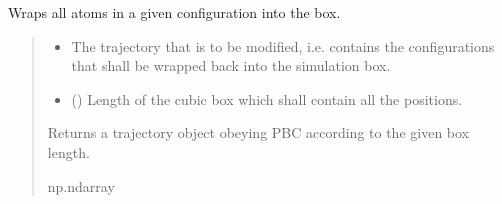 \documentclass[a4paper,10pt,english]{report}
\begin{document}
\begin{fulllineitems}
\label{\detokenize{NNucleate:NNucleate.utils.pbc_config}}
\pysigstartsignatures
{}
\pysigstopsignatures
\sphinxAtStartPar
Wraps all atoms in a given configuration into the box.
\begin{quote}\begin{description}
\begin{itemize}
\item {} 
\sphinxAtStartPar
{} \textendash{} The trajectory that is to be modified, i.e. contains the configurations that shall be wrapped back into the simulation box.

\item {} 
\sphinxAtStartPar
{} () \textendash{} Length of the cubic box which shall contain all the positions.

\end{itemize}

\sphinxAtStartPar
Returns a trajectory object obeying PBC according to the given box length.

\sphinxAtStartPar
np.ndarray

\end{description}\end{quote}

\end{fulllineitems}

\end{document}

